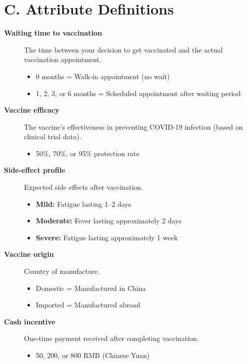 \documentclass[12pt]{article}
\begin{document}
\newpage

\section*{C. Attribute Definitions}

\begin{description}
    \item[\textbf{Waiting time to vaccination}] The time between your decision to get vaccinated and the actual vaccination appointment.
    \begin{itemize}
        \item 0 months = Walk-in appointment (no wait)
        \item 1, 2, 3, or 6 months = Scheduled appointment after waiting period
    \end{itemize}
    
    \item[\textbf{Vaccine efficacy}] The vaccine's effectiveness in preventing COVID-19 infection (based on clinical trial data).
    \begin{itemize}
        \item 50\%, 70\%, or 95\% protection rate
    \end{itemize}
    
    \item[\textbf{Side-effect profile}] Expected side effects after vaccination.
    \begin{itemize}
        \item \textbf{Mild:} Fatigue lasting 1--2 days
        \item \textbf{Moderate:} Fever lasting approximately 2 days
        \item \textbf{Severe:} Fatigue lasting approximately 1 week
    \end{itemize}
    
    \item[\textbf{Vaccine origin}] Country of manufacture.
    \begin{itemize}
        \item Domestic = Manufactured in China
        \item Imported = Manufactured abroad
    \end{itemize}
    
    \item[\textbf{Cash incentive}] One-time payment received after completing vaccination.
    \begin{itemize}
        \item 50, 200, or 800 RMB (Chinese Yuan)
    \end{itemize}
\end{description}
\end{document}
